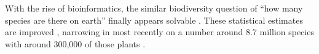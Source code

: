 \documentclass[12pt]{article}
\begin{document}
With the rise of bioinformatics, the similar biodiversity question of
``how many species are there on earth'' finally appears solvable
\citep{may1988many,erwin1991many, stork1993many, joppa2010,
  costello2011, mora2011plos}.  These statistical estimates are
improved , narrowing in most recently on a number around 8.7 million
species with around 300,000 of those plants \citep{joppa2010,
  costello2011, mora2011plos}.
% 
%
%
% 
% 
\end{document}
